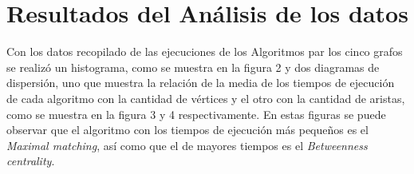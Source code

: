 \documentclass{article}
\begin{document}
\newpage
\section{Resultados del Análisis de los datos}

Con los datos recopilado de las ejecuciones de los Algoritmos par los cinco grafos se realizó un histograma, como se muestra en la figura 2 y dos diagramas de dispersión, uno que muestra la relación de la media de los tiempos de ejecución de cada algoritmo con la cantidad de vértices y el otro con la cantidad de aristas, como se muestra en la figura 3 y 4 respectivamente. En estas figuras se puede observar que el algoritmo con los tiempos de ejecución más pequeños es el \textit{Maximal matching}, así como que el de mayores tiempos es el \textit{Betweenness centrality}. 



  
\begin{center}

\end{center}

\newpage
\begin{center}

\end{center}
\end{document}
